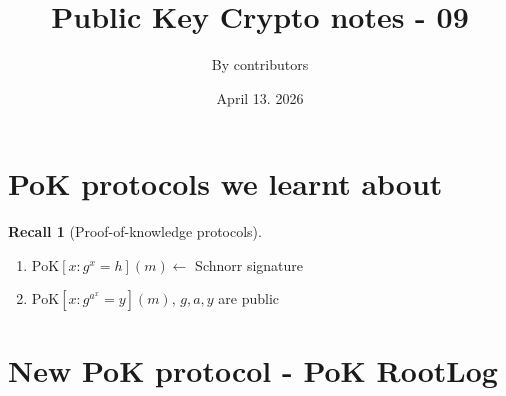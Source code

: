 \documentclass[11pt]{article}
\theoremstyle{definition}
\newtheorem{recall}{Recall}[section]
\begin{document}
\title{Public Key Crypto notes - 09}
\author{By contributors}
\date{April 13. 2026}
\maketitle

\section{PoK protocols we learnt about}

\begin{recall}[Proof-of-knowledge protocols]\leavevmode
	\begin{enumerate}
		\item $\text{PoK}[x:g^x = h](m) \leftarrow$ Schnorr signature
		\item $\text{PoK}[x: g^{a^x} = y](m)$, $g, a, y$ are public
	\end{enumerate}
\end{recall}

\section{New PoK protocol - PoK RootLog}
\end{document}
